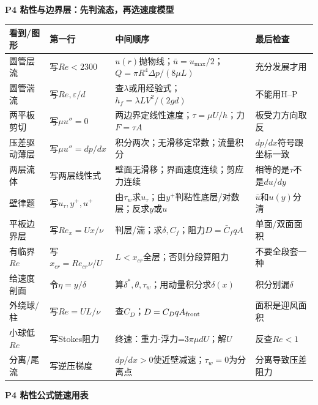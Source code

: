 \documentclass[UTF8,a4paper]{ctexart}
\newcommand{\ftitle}[1]{\vspace{1pt}\textbf{\textcolor{B}{#1}}\par\vspace{0.5pt}}
\begin{document}
\ftitle{P4 粘性与边界层：先判流态，再选速度模型}
\begin{tabular}{|L{0.19\textwidth}|L{0.23\textwidth}|L{0.34\textwidth}|L{0.19\textwidth}|}\hline
\textbf{看到/图形} & \textbf{第一行} & \textbf{中间顺序} & \textbf{最后检查}\\\hline
圆管层流 & 写$Re<2300$ & $u(r)$抛物线；$\bar u=u_{\max}/2$；$Q=\pi R^4\Delta p/(8\mu L)$ & 充分发展才用 \\\hline
圆管湍流 & 写$Re,\varepsilon/d$ & 查$\lambda$或用经验式；$h_f=\lambda L V^2/(2gd)$ & 不能用H--P \\\hline
两平板剪切 & 写$\mu u''=0$ & 两边界定线性速度；$\tau=\mu U/h$；力$F=\tau A$ & 板受力方向取反 \\\hline
压差驱动薄层 & 写$\mu u''=dp/dx$ & 积分两次；无滑移定常数；流量积分 & $dp/dx$符号跟坐标一致 \\\hline
两层流体 & 写两层线性式 & 壁面无滑移；界面速度连续；剪应力连续 & 相等的是$\tau$不是$du/dy$ \\\hline
壁律题 & 写$u_\tau,y^+,u^+$ & 由$\tau_w$求$u_\tau$；由$y^+$判粘性底层/对数层；反求$y$或$u$ & $\bar u$和$u(y)$分清 \\\hline
平板边界层 & 写$Re_x=Ux/\nu$ & 判层/湍；求$\delta,C_f$；阻力$D=\bar C_fqA$ & 单面/双面面积 \\\hline
有临界$Re$ & 写$x_{cr}=Re_{cr}\nu/U$ & $L<x_{cr}$全层；否则分段算阻力 & 不要全段套一种 \\\hline
给速度剖面 & 令$\eta=y/\delta$ & 算$\delta^*,\theta,\tau_w$；用动量积分求$\delta(x)$ & 积分别漏$\delta$ \\\hline
外绕球/柱 & 写$Re=UL/\nu$ & 查$C_D$；$D=C_DqA_{\rm front}$ & 面积是迎风面积 \\\hline
小球低$Re$ & 写Stokes阻力 & 终速：重力-浮力=$3\pi\mu dU$；解$U$ & 反查$Re<1$ \\\hline
分离/尾流 & 写逆压梯度 & $dp/dx>0$使近壁减速；$\tau_w=0$为分离点 & 分离导致压差阻力 \\\hline
\end{tabular}
\ftitle{P4 粘性公式链速用表}
\end{document}

